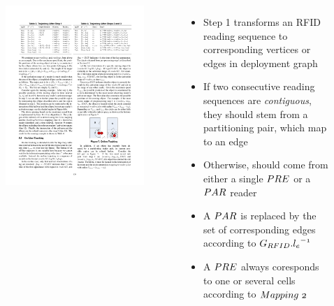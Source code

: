 \begin{frame}
\begin{columns}[c]
\begin{figure}[tb]
      \includegraphics[width=\columnwidth]{figures/2-1/2-1-10.pdf}
    \end{figure}


  \footnotesize{
    \begin{itemize}
      \item Step 1 transforms an RFID reading sequence to corresponding vertices or edges in deployment graph
      \item If two consecutive reading sequences are \emph{contiguous}, they should stem from a partitioning pair, which map to an edge
      \item Otherwise, should come from either a single $\mathnormal{PRE}$ or a $\mathnormal{PAR}$ reader
      \item A $\mathnormal{PAR}$ is replaced by the set of corresponding edges according to $\mathnormal{G_{RFID}.{l_e}^{-1}}$
      \item A $\mathnormal{PRE}$ always coresponds to one or several cells according to $\mathnormal{Mapping~2}$
    \end{itemize}
  }
  \end{columns}

\end{frame}

